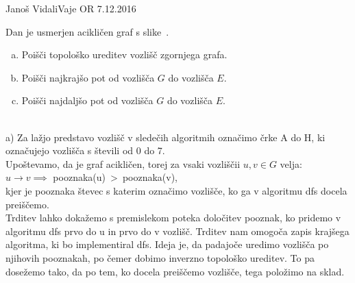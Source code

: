 \begin{naloga}{Janoš Vidali}{Vaje OR 7.12.2016}
\begin{vprasanje}
Dan je usmerjen acikličen graf s slike~\fig.

\begin{enumerate}[(a)]
\item Poišči topološko ureditev vozlišč zgornjega grafa.

\item Poišči najkrajšo pot od vozlišča $G$ do vozlišča $E$.

\item Poišči najdaljšo pot od vozlišča $G$ do vozlišča $E$.
\end{enumerate}

\begin{slika}
\pgfslika
{}
\end{slika}
\end{vprasanje}
\begin{odgovor}\\

\noindent a) Za lažjo predstavo vozlišč v sledečih algoritmih
označimo črke A do H, ki označujejo vozlišča s števili od 0 do 7.\\

\noindent Upoštevamo, da je graf acikličen, torej za vsaki vozliščii $u, v \in G$ velja: \\[5px]
$u \rightarrow v \implies $ pooznaka(u)\ \textgreater \ pooznaka(v), \\[5px]
kjer je pooznaka števec s katerim označimo vozlišče, ko ga v algoritmu dfs docela preiščemo.\\

\noindent Trditev lahko dokažemo s premislekom poteka določitev pooznak,
ko pridemo v algoritmu dfs prvo do u in prvo do v vozlišč.
Trditev nam omogoča zapis krajšega algoritma, ki bo implementiral dfs.
Ideja je, da padajoče uredimo vozlišča po njihovih pooznakah,
po čemer dobimo inverzno topološko ureditev.
To pa dosežemo tako, da po tem, ko docela preiščemo vozlišče, tega položimo na sklad. \\


\end{odgovor}
\end{naloga}
